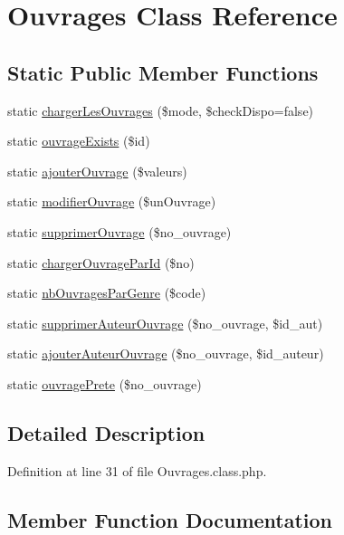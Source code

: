 \hypertarget{class_ouvrages}{}\section{Ouvrages Class Reference}
\label{class_ouvrages}
\subsection*{Static Public Member Functions}
\begin{DoxyCompactItemize}
\item 
static \hyperlink{class_ouvrages_af2c4af387fa3e2e41edda17d792dfc96}{charger\+Les\+Ouvrages} (\$mode, \$check\+Dispo=false)
\item 
static \hyperlink{class_ouvrages_ae6d9a43ac05125ac2e1d8f5b60bf5c8e}{ouvrage\+Exists} (\$id)
\item 
static \hyperlink{class_ouvrages_ad36026065aaca6cac63ef4e66262f308}{ajouter\+Ouvrage} (\$valeurs)
\item 
static \hyperlink{class_ouvrages_a77ae740b5cec0349f9ab60dd4e169ef2}{modifier\+Ouvrage} (\$un\+Ouvrage)
\item 
static \hyperlink{class_ouvrages_ad1b8821c79904425d52ab89a4749a5a1}{supprimer\+Ouvrage} (\$no\+\_\+ouvrage)
\item 
static \hyperlink{class_ouvrages_a6f96bbdab9d3aecd6b92748bf5055dfe}{charger\+Ouvrage\+Par\+Id} (\$no)
\item 
static \hyperlink{class_ouvrages_a15c7d28c326ff43eaa69cfccf26ce061}{nb\+Ouvrages\+Par\+Genre} (\$code)
\item 
static \hyperlink{class_ouvrages_a9f9eab8ac36a24575fd412cd7086df76}{supprimer\+Auteur\+Ouvrage} (\$no\+\_\+ouvrage, \$id\+\_\+aut)
\item 
static \hyperlink{class_ouvrages_ad6a40af1bda2b83511710e6a067a1d1a}{ajouter\+Auteur\+Ouvrage} (\$no\+\_\+ouvrage, \$id\+\_\+auteur)
\item 
static \hyperlink{class_ouvrages_aa9e652f19a5cf956a6a3fe4de72a1c88}{ouvrage\+Prete} (\$no\+\_\+ouvrage)
\end{DoxyCompactItemize}


\subsection{Detailed Description}


Definition at line 31 of file Ouvrages.\+class.\+php.



\subsection{Member Function Documentation}
\mbox{\label{class_ouvrages_ad6a40af1bda2b83511710e6a067a1d1a}} 
